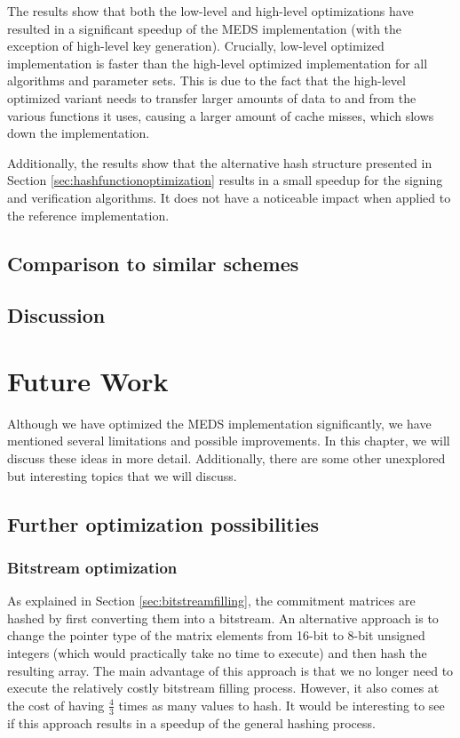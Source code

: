 \documentclass[11pt,a4paper]{report}
\theoremstyle{definition}
\begin{document}
The results show that both the low-level and high-level optimizations have resulted in a significant speedup of the MEDS implementation (with the exception of high-level key generation). Crucially, low-level optimized implementation is faster than the high-level optimized implementation for all algorithms and parameter sets. This is due to the fact that the high-level optimized variant needs to transfer larger amounts of data to and from the various functions it uses, causing a larger amount of cache misses, which slows down the implementation.

Additionally, the results show that the alternative hash structure presented in Section \ref{sec:hashfunctionoptimization} results in a small speedup for the signing and verification algorithms. It does not have a noticeable impact when applied to the reference implementation.

\section{Comparison to similar schemes}

\section{Discussion}

\chapter{Future Work}
\label{ch:futurework}
Although we have optimized the MEDS implementation significantly, we have mentioned several limitations and possible improvements. In this chapter, we will discuss these ideas in more detail. Additionally, there are some other unexplored but interesting topics that we will discuss.

\section{Further optimization possibilities}
\label{sec:futureworkopt}

\subsection*{Bitstream optimization}
As explained in Section \ref{sec:bitstreamfilling}, the commitment matrices are hashed by first converting them into a bitstream. An alternative approach is to change the pointer type of the matrix elements from 16-bit to 8-bit unsigned integers (which would practically take no time to execute) and then hash the resulting array. The main advantage of this approach is that we no longer need to execute the relatively costly bitstream filling process. However, it also comes at the cost of having $\frac{4}{3}$ times as many values to hash. It would be interesting to see if this approach results in a speedup of the general hashing process.
\end{document}
